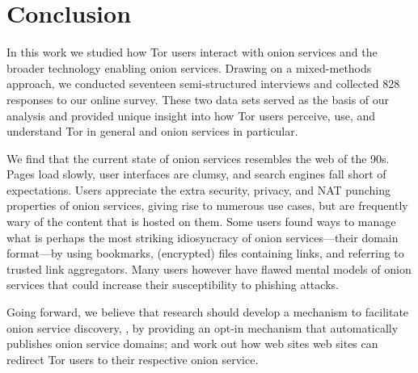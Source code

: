 \section{Conclusion}
\label{sec:conclusion}

In this work we studied how Tor users interact with onion services and the
broader technology enabling onion services.  Drawing on a mixed-methods
approach, we conducted seventeen semi-structured interviews and collected 828
responses to our online survey.  These two data sets served as the basis of our
analysis and provided unique insight into how Tor users perceive, use, and
understand Tor in general and onion services in particular.

We find that the current state of onion services resembles the web of the 90s.
Pages load slowly, user interfaces are clumsy, and search engines fall short of
expectations.  Users appreciate the extra security, privacy, and NAT punching
properties of onion services, giving rise to numerous use cases, but are
frequently wary of the content that is hosted on them.  Some users found ways to
manage what is perhaps the most striking idiosyncracy of onion services---their
domain format---by using bookmarks, (encrypted) files containing links, and
referring to trusted link aggregators.  Many users however have flawed mental
models of onion services that could increase their susceptibility to phishing
attacks.

Going forward, we believe that research should \first develop a mechanism to
facilitate onion service discovery, \eg, by providing an opt-in mechanism that 
automatically publishes onion service domains; and \second work out how web
sites web sites can redirect Tor users to their respective onion service.
